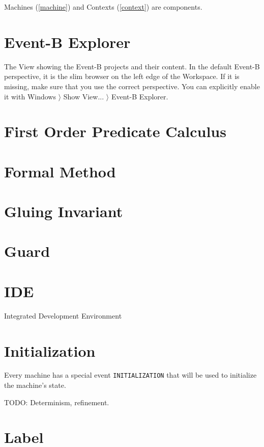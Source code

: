 Machines (\ref{machine}) and Contexts (\ref{context}) are components.

\section{Event-B Explorer}
\label{eventb_explorer}

The View showing the Event-B projects and their content.  In the default Event-B perspective, it is the slim browser on the left edge of the Workspace.  If it is missing, make sure that you use the correct perspective.  You can explicitly enable it with \textsf{Windows $\rangle$ Show View... $\rangle$ Event-B Explorer}.

\section{First Order Predicate Calculus}
\label{first_order_predicate_calculus}


\section{Formal Method}
\label{formal_method}

\section{Gluing Invariant}
\label{gluing_invariant}

\section{Guard}
\label{guard}

\section{IDE}
\label{ide}

Integrated Development Environment

\section{Initialization}
\label{initialization}

Every machine has a special event \texttt{INITIALIZATION} that will be used to initialize the machine's state.

TODO: Determinism, refinement.

\section{Label}
\label{label}

